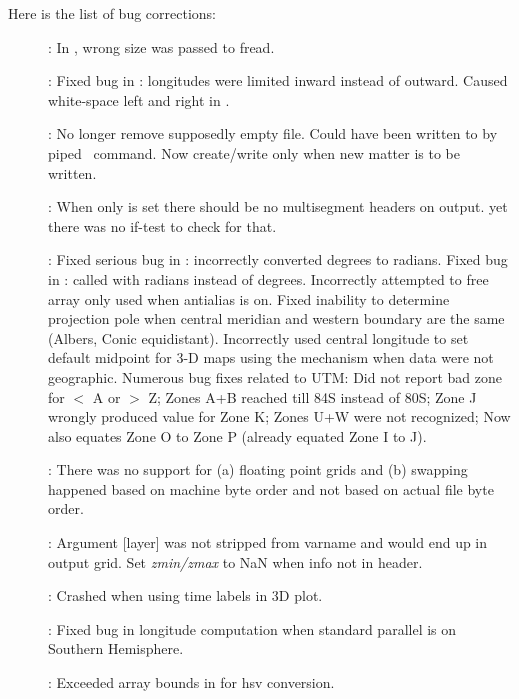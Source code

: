 Here is the list of bug corrections:
\begin{description}
	\item []: In , wrong size was passed to fread.
	\item []: Fixed bug in : longitudes were limited inward
		instead of outward. Caused white-space left and right in .
	\item []: No longer remove supposedly empty  file.
		Could have been written to by piped \GMT\ command. Now create/write only when new matter is to be written.
	\item []: When only  is set there should be no multisegment headers on output.
		yet there was no if-test to check for that.
	\item []: Fixed serious bug in : incorrectly
		converted degrees to radians. Fixed bug in : called  with radians instead of degrees.
		Incorrectly attempted to free array only used when antialias is on.
		Fixed inability to determine projection pole when central meridian and western boundary are the same (Albers, Conic equidistant).
		Incorrectly used central longitude to set default midpoint for 3-D maps using the  mechanism when data were not geographic.
		Numerous bug fixes related to UTM: Did not report bad zone
		for $<$ A or $>$ Z; Zones A+B reached till 84S instead of 80S; Zone J
		wrongly produced value for Zone K; Zones U+W were not recognized;
		Now also equates Zone O to Zone P (already equated Zone I to J).
	\item []: There was no support for (a) floating point grids and (b) swapping happened based
		on machine byte order and not based on actual file byte order.
	\item []:  Argument [layer] was not stripped from varname and would end up
		in output grid.  Set {\it zmin/zmax} to NaN when info not in header.
	\item []: Crashed when using time labels in 3D plot.
	\item []: Fixed bug in longitude computation when standard parallel is on Southern Hemisphere.
	\item []: Exceeded array bounds in  for hsv conversion.

\end{description}

